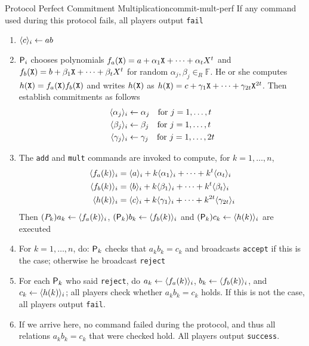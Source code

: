 \begin{protocol}{Protocol Perfect Commitment Multiplication}{commit-mult-perf}
  If any command used during this protocol fails, all players output \texttt{fail}
  \begin{enumerate}
  	\item $\commit{c}{i} \leftarrow ab$
    \item $\P_i$ chooses polynomials $f_a(\X) = a + \alpha_1 \X + \cdots + \alpha_tX^t$ and $f_b(\X) = b + \beta_1 \X + \cdots + \beta_tX^t$ for random $\alpha_j, \beta_j \in_R \mathbb F$. He or she computes $h(\X)=f_a(\X)f_b(\X)$ and writes $h(\X)$ as $h(\X) = c + \gamma_1 \X + \cdots + \gamma_{2t} \X^{2t}$. Then establish commitments as follows
    \begin{align*}
      \commit{\alpha_j}i &\leftarrow \alpha_j \quad \text{for } j=1, \dots, t \\
      \commit{\beta_j}i &\leftarrow \beta_j \quad \text{for } j=1, \dots, t \\
      \commit{\gamma_j}i &\leftarrow \gamma_j \quad \text{for } j=1, \dots, 2t
    \end{align*}
    \item The \texttt{add} and \texttt{mult} commands are invoked to compute, for $k=1 ,\dots, n$,
    \begin{align*} 
      \commit{f_a(k)}i &= \commit{a}i + k \commit{\alpha_1}i + \cdots + k^t \commit{\alpha_t}i \\
      \commit{f_b(k)}i &= \commit{b}i + k \commit{\beta_1}i + \cdots + k^t \commit{\beta_t}i \\
      \commit{h(k)}i &= \commit{c}i + k \commit{\gamma_1}i + \cdots + k^{2t} \commit{\gamma_{2t}}i
    \end{align*} 
    Then $(P_k)a_k \leftarrow \commit{f_a(k)}i$, $(\P_k)b_k \leftarrow \commit{f_b(k)}i$ and $(\P_k)c_k \leftarrow \commit{h(k)}i$ are executed
    \item For $k=1, \dots,n$, do: $\P_k$ checks that $a_kb_k = c_k$ and broadcasts \texttt{accept} if this is the case; otherwise he broadcast \texttt{reject}
    \item For each $\P_k$ who said \texttt{reject}, do $a_k \leftarrow \commit{f_a(k)}i$, $b_k \leftarrow \commit{f_b(k)}i$, and $c_k \leftarrow \commit{h(k)}i$; all players check whether $a_kb_k = c_k$ holds. If this is not the case, all players output \texttt{fail}.
    \item If we arrive here, no command failed during the protocol, and thus all relations $a_kb_k = c_k$ that were checked hold. All players output \texttt{success}.

  \end{enumerate}
\end{protocol}

